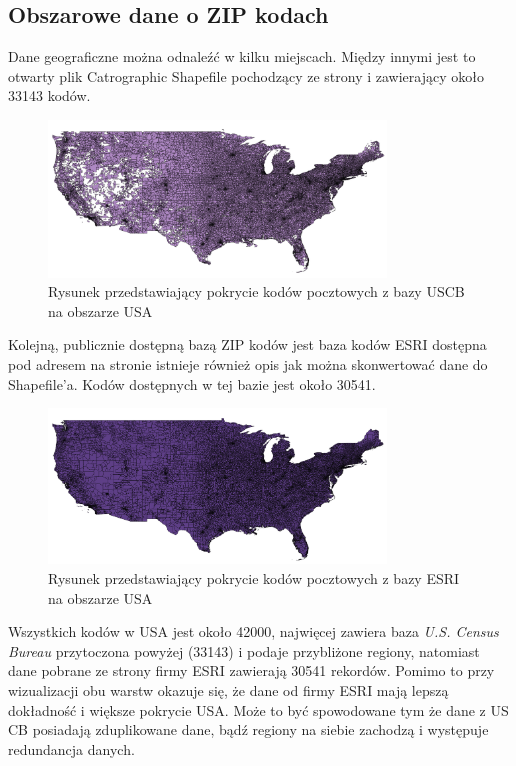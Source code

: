 \documentclass[10pt,a4paper]{article}
\begin{document}
\subsection{Obszarowe dane o ZIP kodach\label{sec:obszZIP}}
Dane geograficzne można odnaleźć w kilku miejscach.
Między innymi jest to otwarty plik Catrographic Shapefile pochodzący ze strony \cite[US Census Bureau]{unitedStateCensusBureauGeoMaps}
i zawierający około 33143 kodów.

\begin{figure}[H]
    \centering
    \includegraphics[width=0.8\textwidth]{bazaUSCB.png}
    \caption{Rysunek przedstawiający pokrycie kodów pocztowych z bazy USCB na obszarze USA}
    \label{fig:imageUSCB}
\end{figure}

Kolejną, publicznie dostępną bazą ZIP kodów jest baza kodów ESRI dostępna pod adresem \cite[Arcgis]{arcgisDatabase} na stronie istnieje również opis jak można skonwertować dane do Shapefile'a. Kodów dostępnych w tej bazie jest około 30541. 

\begin{figure}[H]
    \centering
    \includegraphics[width=0.8\textwidth]{bazaESRI.png}
    \caption{Rysunek przedstawiający pokrycie kodów pocztowych z bazy ESRI na obszarze USA}
    \label{fig:imageESRI}
\end{figure}
 
Wszystkich kodów w  USA jest około 42000, najwięcej zawiera baza  \textit{U.S. Census Bureau} przytoczona powyżej (33143) i podaje przybliżone regiony, natomiast dane pobrane ze strony firmy ESRI zawierają 30541 rekordów. Pomimo to przy wizualizacji obu warstw okazuje się, że dane od firmy ESRI mają lepszą dokładność i większe pokrycie USA. Może to być spowodowane tym że dane z US CB posiadają zduplikowane dane, bądź regiony na siebie zachodzą i występuje redundancja danych.
\end{document}
